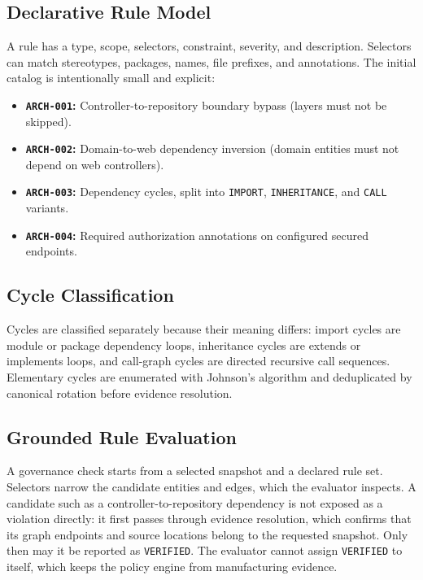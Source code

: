 \documentclass[runningheads]{llncs}
\begin{document}
\subsection{Declarative Rule Model}
A rule has a type, scope, selectors, constraint, severity, and description. Selectors can match stereotypes, packages, names, file prefixes, and annotations. The initial catalog is intentionally small and explicit:
\begin{itemize}
    \item \textbf{\texttt{ARCH-001}:} Controller-to-repository boundary bypass (layers must not be skipped).
    \item \textbf{\texttt{ARCH-002}:} Domain-to-web dependency inversion (domain entities must not depend on web controllers).
    \item \textbf{\texttt{ARCH-003}:} Dependency cycles, split into \texttt{IMPORT}, \texttt{INHERITANCE}, and \texttt{CALL} variants.
    \item \textbf{\texttt{ARCH-004}:} Required authorization annotations on configured secured endpoints.
\end{itemize}

\subsection{Cycle Classification}
Cycles are classified separately because their meaning differs: import cycles are module or package dependency loops, inheritance cycles are extends or implements loops, and call-graph cycles are directed recursive call sequences. Elementary cycles are enumerated with Johnson's algorithm \cite{johnson1975circuits} and deduplicated by canonical rotation before evidence resolution.

\subsection{Grounded Rule Evaluation}
A governance check starts from a selected snapshot and a declared rule set. Selectors narrow the candidate entities and edges, which the evaluator inspects. A candidate such as a controller-to-repository dependency is not exposed as a violation directly: it first passes through evidence resolution, which confirms that its graph endpoints and source locations belong to the requested snapshot. Only then may it be reported as \texttt{VERIFIED}. The evaluator cannot assign \texttt{VERIFIED} to itself, which keeps the policy engine from manufacturing evidence.
\end{document}
